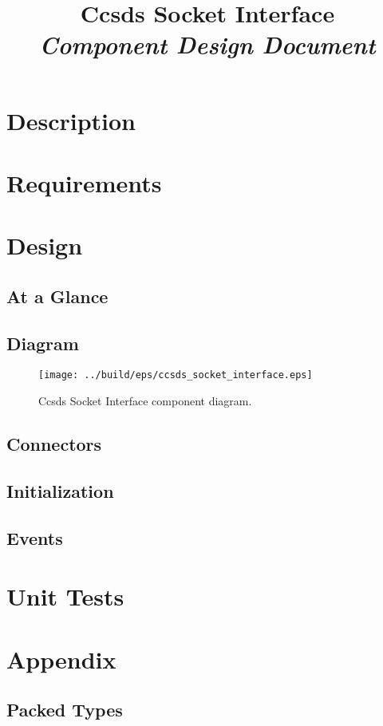 



\title{\textbf{Ccsds Socket Interface} \\
\large\textit{Component Design Document}}
\date{}
\maketitle

\section{Description}


\section{Requirements}


\section{Design}

\subsection{At a Glance}


\subsection{Diagram}
\begin{figure}[H]
  \texttt{[image: ../build/eps/ccsds\_socket\_interface.eps]}
  \caption{Ccsds Socket Interface component diagram.}
\end{figure}

\subsection{Connectors}


\subsection{Initialization}


\subsection{Events}



\section{Unit Tests}



\section{Appendix}
\subsection{Packed Types}




